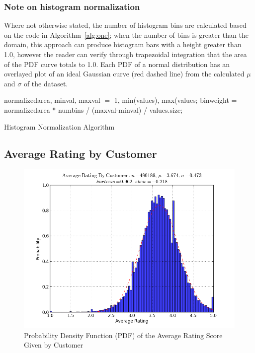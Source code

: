 \documentclass{acmtog}
\begin{document}
\subsubsection{Note on histogram normalization}Where not otherwise stated, the number of histogram bins are calculated based on the code in Algorithm~\ref{alg:one}; when the number of bins is greater than the domain, this approach can produce histogram bars with a height greater than 1.0, however the reader can verify through trapezoidal integration that the area of the PDF curve totals to 1.0. Each PDF of a normal distribution has an overlayed plot of an ideal Gaussian curve (red dashed line) from the calculated $\mu$ and $\sigma$ of the dataset.

\begin{algorithm}[t]
\SetAlgoNoLine
{}
normalizedarea, minval, maxval $=$ 1, min(values), max(values; \newline
binweight = normalizedarea * numbins / (maxval-minval) / values.size; \newline
\caption{Histogram Normalization Algorithm}
\label{alg:one}
\end{algorithm}

\subsection{Average Rating by Customer}

\begin{figure}
\centerline{\includegraphics[scale=.5]{average_rating_by_customer.png}}
\caption{Probability Density Function (PDF) of the Average Rating Score Given by Customer}
\label{fig:three}
\end{figure}
\end{document}

